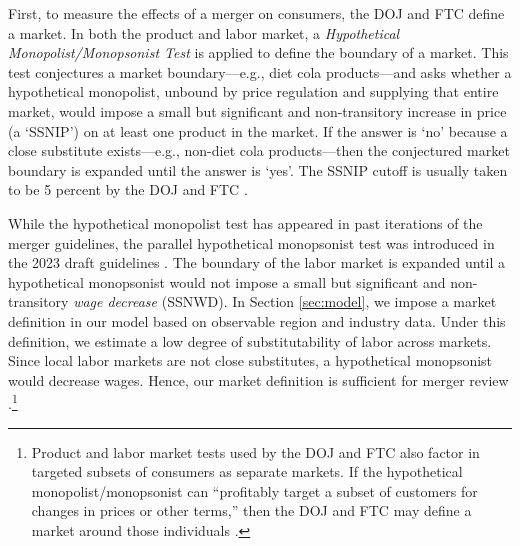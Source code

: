 \documentclass[12pt]{article}
\theoremstyle{prop}
\begin{document}
First, to measure the effects of a merger on consumers, the DOJ and FTC define a market.
In both the product and labor market, a \textit{Hypothetical Monopolist/Monopsonist Test} is applied to define the boundary of a market. 
This test conjectures a market boundary---e.g., diet cola products---and asks whether a hypothetical monopolist, unbound by price regulation and supplying that entire market, would impose a small but significant and non-transitory increase in price (a `SSNIP') on at least one product in the market. 
If the answer is `no' because a close substitute exists---e.g., non-diet cola products---then the conjectured market boundary is expanded until the answer is `yes'. 
The SSNIP cutoff is usually taken to be 5 percent by the DOJ and FTC \citep[][p.~42]{doj2023final}. 

While the hypothetical monopolist test has appeared in past iterations of the merger guidelines, the parallel hypothetical monopsonist test was introduced in the 2023 draft guidelines \citep[][p.~42]{doj2023final}.
The boundary of the labor market is expanded until a hypothetical monopsonist would not impose a small but significant and non-transitory \emph{wage decrease} (SSNWD).
In Section \ref{sec:model}, we impose a market definition in our model based on observable region and industry data. 
Under this definition, we estimate a low degree of substitutability of labor across markets. 
Since local labor markets are not close substitutes, a hypothetical monopsonist would decrease wages.
Hence, our market definition is sufficient for merger review \citep[][p.~42]{doj2023final}.\footnote{
    Product and labor market tests used by the DOJ and FTC also factor in targeted subsets of consumers as separate markets. 
    If the hypothetical monopolist/monopsonist can ``profitably target a subset of customers for changes in prices or other terms,'' then the  DOJ and FTC may define a market around those individuals \citep[][p.~44]{doj2023final}.}
 
\end{document}
